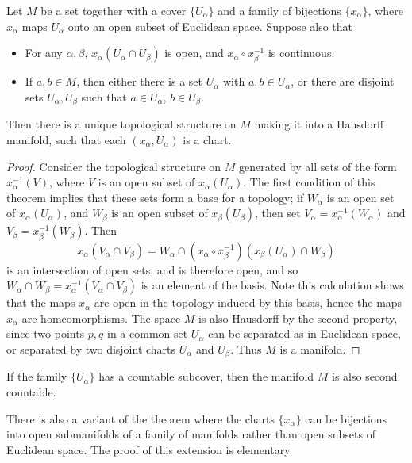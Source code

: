 \begin{theorem}
    Let $M$ be a set together with a cover $\{ U_\alpha \}$ and a family of bijections $\{ x_\alpha \}$, where $x_\alpha$ maps $U_\alpha$ onto an open subset of Euclidean space. Suppose also that
    \begin{itemize}
        \item For any $\alpha, \beta$, $x_\alpha(U_\alpha \cap U_\beta)$ is open, and $x_\alpha \circ x_\beta^{-1}$ is continuous.
        \item If $a, b \in M$, then either there is a set $U_\alpha$ with $a,b \in U_\alpha$, or there are disjoint sets $U_\alpha, U_\beta$ such that $a \in U_\alpha$, $b \in U_\beta$.
    \end{itemize}
    Then there is a unique topological structure on $M$ making it into a Hausdorff manifold, such that each $(x_\alpha, U_\alpha)$ is a chart.
\end{theorem}
\begin{proof}
    Consider the topological structure on $M$ generated by all sets of the form $x_\alpha^{-1}(V)$, where $V$ is an open subset of $x_\alpha(U_\alpha)$. The first condition of this theorem implies that these sets form a base for a topology; if $W_\alpha$ is an open set of $x_\alpha(U_\alpha)$, and $W_\beta$ is an open subset of $x_\beta(U_\beta)$, then set $V_\alpha = x_\alpha^{-1}(W_\alpha)$ and $V_\beta = x_\beta^{-1}(W_\beta)$. Then
    \[ x_\alpha(V_\alpha \cap V_\beta) = W_\alpha \cap (x_\alpha \circ x_\beta^{-1})(x_\beta(U_\alpha) \cap W_\beta) \]
    is an intersection of open sets, and is therefore open, and so $W_\alpha \cap W_\beta = x_\alpha^{-1}(V_\alpha \cap V_\beta)$ is an element of the basis. Note this calculation shows that the maps $x_\alpha$ are open in the topology induced by this basis, hence the maps $x_\alpha$ are homeomorphisms. The space $M$ is also Hausdorff by the second property, since two points $p,q$ in a common set $U_\alpha$ can be separated as in Euclidean space, or separated by two disjoint charts $U_\alpha$ and $U_\beta$. Thus $M$ is a manifold.
\end{proof}

\begin{remark}
    If the family $\{ U_\alpha \}$ has a countable subcover, then the manifold $M$ is also second countable.
\end{remark}

\begin{remark}
    There is also a variant of the theorem where the charts $\{ x_\alpha \}$ can be bijections into open submanifolds of a family of manifolds rather than open subsets of Euclidean space. The proof of this extension is elementary.
\end{remark}

